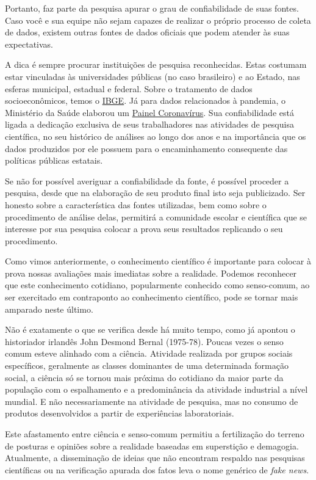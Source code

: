 Portanto, faz parte da pesquisa apurar o grau de confiabilidade de suas fontes. Caso você e sua equipe não sejam capazes de realizar o próprio processo de coleta de dados, existem outras fontes de dados oficiais que podem atender às suas expectativas.

A dica é sempre procurar instituições de pesquisa reconhecidas. Estas costumam estar vinculadas às universidades públicas (no caso brasileiro) e ao Estado, nas esferas municipal, estadual e federal. Sobre o tratamento de dados socioeconômicos, temos o  \href{https://www.ibge.gov.br/}{IBGE}. Já para dados relacionados à pandemia, o Ministério da Saúde elaborou um \href{https://covid.saude.gov.br/}{Painel Coronavírus}. Sua confiabilidade está ligada a dedicação exclusiva de seus trabalhadores nas atividades de pesquisa científica, no seu histórico de análises ao longo dos anos e na importância que os dados produzidos por ele possuem para o encaminhamento consequente das políticas públicas estatais.

Se não for possível averiguar a confiabilidade da fonte, é possível proceder a pesquisa, desde que na elaboração de seu produto final isto seja publicizado. Ser honesto sobre a característica das fontes utilizadas, bem como sobre o procedimento de análise delas, permitirá a comunidade escolar e científica que se interesse por sua pesquisa colocar a prova seus resultados replicando o seu procedimento.


Como vimos anteriormente, o conhecimento científico é importante para colocar à prova nossas avaliações mais imediatas sobre a realidade. Podemos reconhecer que este conhecimento cotidiano, popularmente conhecido como senso-comum, ao ser exercitado em contraponto ao conhecimento científico, pode se tornar mais amparado neste último.

Não é exatamente o que se verifica desde há muito tempo, como já apontou o historiador irlandês John Desmond Bernal (1975-78). Poucas vezes o senso comum esteve alinhado com a ciência. Atividade realizada por grupos sociais específicos, geralmente as classes dominantes de uma determinada formação social, a ciência só se tornou mais próxima do cotidiano da maior parte da população com o espalhamento e a predominância da atividade industrial a nível mundial. E não necessariamente na atividade de pesquisa, mas no consumo de produtos desenvolvidos a partir de experiências laboratoriais.

Este afastamento entre ciência e senso-comum permitiu a fertilização do terreno de posturas e opiniões sobre a realidade baseadas em superstição e demagogia. Atualmente, a disseminação de ideias que não encontram respaldo nas pesquisas científicas ou na verificação apurada dos fatos leva o nome genérico de \textit{fake news}.

